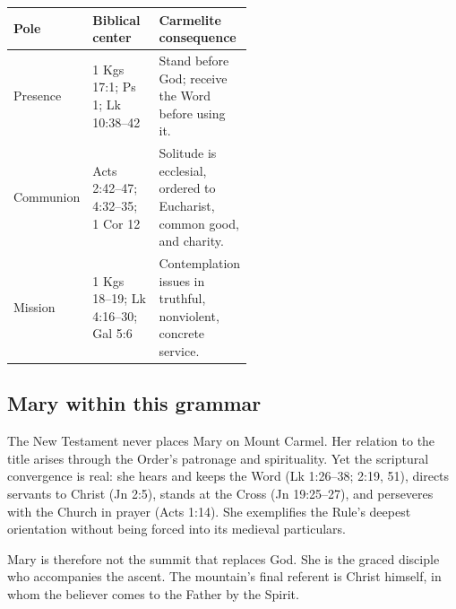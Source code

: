 \begin{center}
\small
\begin{tabularx}{\linewidth}{@{}p{0.2\linewidth}p{0.33\linewidth}X@{}}
\toprule
\textbf{Pole} & \textbf{Biblical center} & \textbf{Carmelite consequence}\\
\midrule
Presence & 1 Kgs 17:1; Ps 1; Lk 10:38--42 & Stand before God; receive the Word before using it.\\
Communion & Acts 2:42--47; 4:32--35; 1 Cor 12 & Solitude is ecclesial, ordered to Eucharist, common good, and charity.\\
Mission & 1 Kgs 18--19; Lk 4:16--30; Gal 5:6 & Contemplation issues in truthful, nonviolent, concrete service.\\
\bottomrule
\end{tabularx}
\end{center}

\subsection{Mary within this grammar}

The New Testament never places Mary on Mount Carmel. Her relation to the title arises through the Order's patronage and spirituality. Yet the scriptural convergence is real: she hears and keeps the Word (Lk 1:26--38; 2:19, 51), directs servants to Christ (Jn 2:5), stands at the Cross (Jn 19:25--27), and perseveres with the Church in prayer (Acts 1:14). She exemplifies the Rule's deepest orientation without being forced into its medieval particulars.

Mary is therefore not the summit that replaces God. She is the graced disciple who accompanies the ascent. The mountain's final referent is Christ himself, in whom the believer comes to the Father by the Spirit.
